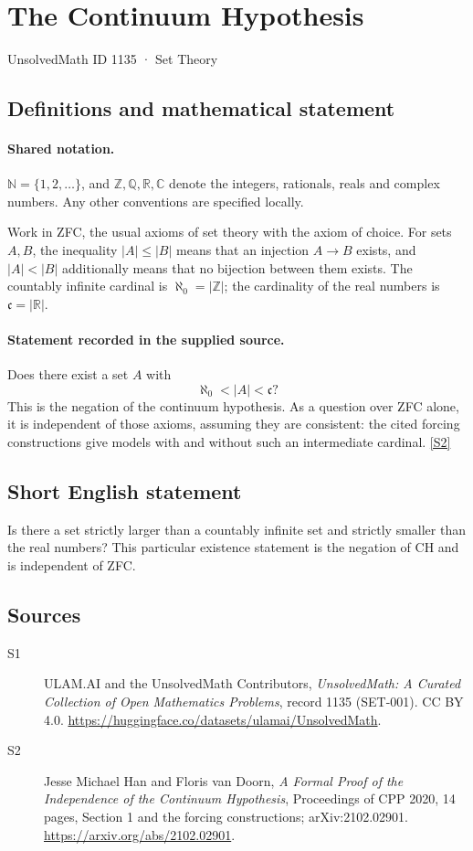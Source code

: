 \documentclass[11pt]{article}
\newcommand{\sref}[2]{\hyperlink{source:#1:#2}{[S#2]}}
\begin{document}
\setcounter{section}{1134}
\section{The Continuum Hypothesis}\label{1135}
{\small\sffamily UnsolvedMath ID 1135 · Set Theory}
\subsection{Definitions and mathematical statement}

\paragraph{Shared notation.}$\mathbb N=\{1,2,\ldots\}$, and $\mathbb Z,\mathbb Q,\mathbb R,\mathbb C$ denote the integers, rationals, reals and complex numbers. Any other conventions are specified locally.


Work in ZFC, the usual axioms of set theory with the axiom of choice.
For sets \(A,B\), the inequality \(|A|\le|B|\) means that an injection
\(A\to B\) exists, and \(|A|<|B|\) additionally means that no bijection
between them exists.  The countably infinite cardinal is
\(\aleph_0=|\mathbb Z|\); the cardinality of the real numbers is
\(\mathfrak c=|\mathbb R|\).
\paragraph{Statement recorded in the supplied source.}
Does there exist a set \(A\) with
\[
 \aleph_0<|A|<\mathfrak c?
\]
This is the negation of the continuum hypothesis.  As a question over
ZFC alone, it is independent of those axioms, assuming they are
consistent: the cited forcing constructions give models with and
without such an intermediate cardinal. \sref{1135}{2}
\subsection{Short English statement}
Is there a set strictly larger than a countably infinite set and strictly smaller than the real numbers? This particular existence statement is the negation of CH and is independent of ZFC.
\subsection{Sources}
\begin{description}
\item[\hypertarget{source:1135:1}{S1}] ULAM.AI and the UnsolvedMath Contributors, \emph{UnsolvedMath: A Curated Collection of Open Mathematics Problems}, record 1135 (SET-001). CC BY 4.0. \url{https://huggingface.co/datasets/ulamai/UnsolvedMath}.
\item[\hypertarget{source:1135:2}{S2}] Jesse Michael Han and Floris van Doorn, \emph{A Formal Proof of the Independence of the Continuum Hypothesis}, Proceedings of CPP 2020, 14 pages, Section 1 and the forcing constructions; arXiv:2102.02901. \url{https://arxiv.org/abs/2102.02901}.
\end{description}
\label{end:1135}
\end{document}
